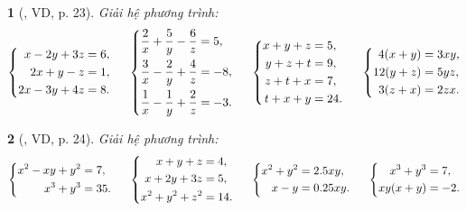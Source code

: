\documentclass{article}
\newtheorem{baitoan}{}
\begin{document}
\begin{baitoan}[\cite{Binh_boi_duong_Toan_9_tap_2}, VD, p. 23]
	Giải hệ phương trình:
	\begin{equation*}
		\left\{\begin{split}
			x - 2y + 3z &= 6,\\
			2x + y - z &= 1,\\
			2x - 3y + 4z &= 8.
		\end{split}\right.\hspace{5mm}\left\{\begin{split}
			\frac{2}{x} + \frac{5}{y} - \frac{6}{z} &= 5,\\
			\frac{3}{x} - \frac{2}{y} + \frac{4}{z} &= -8,\\
			\frac{1}{x} - \frac{1}{y} + \frac{2}{z} &= -3.
		\end{split}\right.\hspace{5mm}\left\{\begin{split}
			x + y + z &= 5,\\
			y + z + t &= 9,\\
			z + t + x &= 7,\\
			t + x + y &= 24.
		\end{split}\right.\hspace{5mm}\left\{\begin{split}
			4(x + y) &= 3xy,\\
			12(y + z) &= 5yz,\\
			3(z + x) &= 2zx.
		\end{split}\right.
	\end{equation*}
\end{baitoan}

\begin{baitoan}[\cite{Binh_boi_duong_Toan_9_tap_2}, VD, p. 24]
	Giải hệ phương trình:
	\begin{equation*}
		\left\{\begin{split}
			x^2 - xy + y^2 &= 7,\\
			x^3 + y^3 &= 35.
		\end{split}\right.\hspace{5mm}\left\{\begin{split}
			x + y + z &= 4,\\
			x + 2y + 3z &= 5,\\
			x^2 + y^2 + z^2 &= 14.
		\end{split}\right.\hspace{5mm}\left\{\begin{split}
			x^2 + y^2 &= 2.5xy,\\
			x - y &= 0.25xy.
		\end{split}\right.\hspace{5mm}\left\{\begin{split}
			x^3 + y^3 &= 7,\\
			xy(x + y) &= -2.
		\end{split}\right.
	\end{equation*}
\end{baitoan}
\end{document}
